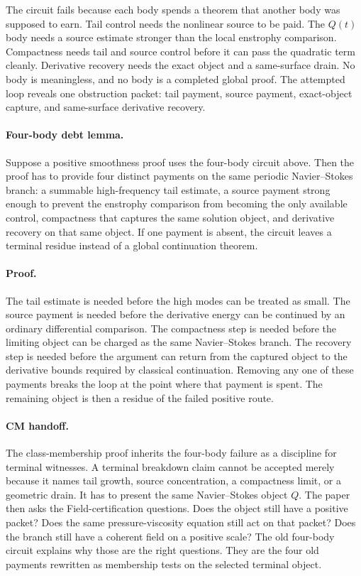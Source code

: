 The circuit fails because each body spends a theorem that another body was
supposed to earn.
Tail control needs the nonlinear source to be paid.
The \(Q(t)\) body needs a source estimate stronger than the local enstrophy
comparison.
Compactness needs tail and source control before it can pass the quadratic
term cleanly.
Derivative recovery needs the exact object and a same-surface drain.
No body is meaningless, and no body is a completed global proof.  The attempted
loop reveals one obstruction packet: tail payment, source payment, exact-object
capture, and same-surface derivative recovery.

\paragraph{Four-body debt lemma.}
Suppose a positive smoothness proof uses the four-body circuit above.
Then the proof has to provide four distinct payments on the same periodic
Navier--Stokes branch: a summable high-frequency tail estimate, a source
payment strong enough to prevent the enstrophy comparison from becoming the
only available control, compactness that captures the same solution object, and
derivative recovery on that same object.
If one payment is absent, the circuit leaves a terminal residue instead of a
global continuation theorem.

\paragraph{Proof.}
The tail estimate is needed before the high modes can be treated as small.
The source payment is needed before the derivative energy can be continued by
an ordinary differential comparison.
The compactness step is needed before the limiting object can be charged as the
same Navier--Stokes branch.
The recovery step is needed before the argument can return from the captured
object to the derivative bounds required by classical continuation.
Removing any one of these payments breaks the loop at the point where that
payment is spent.
The remaining object is then a residue of the failed positive route.

\paragraph{CM handoff.}
The class-membership proof inherits the four-body failure as a discipline for
terminal witnesses.
A terminal breakdown claim cannot be accepted merely because it names tail
growth, source concentration, a compactness limit, or a geometric drain.
It has to present the same Navier--Stokes object \(Q\).
The paper then asks the Field-certification questions.
Does the object still have a positive packet?
Does the same pressure-viscosity equation still act on that packet?
Does the branch still have a coherent field on a positive scale?
The old four-body circuit explains why those are the right questions.
They are the four old payments rewritten as membership tests on the selected
terminal object.

